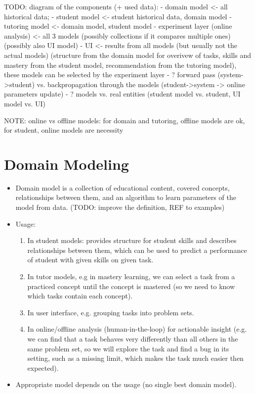 TODO: diagram of the components (+ used data):
- domain model <- all historical data;
- student model <- student historical data, domain model
- tutoring model <- domain model, student model
- experiment layer (online analysis) <- all 3 models (possibly collections if it compares multiple ones) (possibly also UI model)
- UI <- results from all models (but usually not the actual models) (structure from the domain model for overivew of tasks, skills and mastery from the student model, recommendation from the tutoring model), these models can be selected by the experiment layer
- ? forward pass (system->student) vs. backpropagation through the models (student->system -> online parameters update)
- ? models vs. real entities (student model vs. student, UI model vs. UI)


NOTE: online vs offline models: for domain and tutoring, offline models are ok, for student, online models are necessity




\section{Domain Modeling}
\label{sec:domain-modeling}

\begin{itemize}
\item Domain model is a collection of educational content, covered concepts,
  relationships between them, and an algorithm to learn
  parameters of the model from data.
  (TODO: improve the definition, REF to examples)
\item Usage:
\begin{enumerate}
\item In student models: provides structure for student skills and describes relationships between them, which can be used to predict a performance of student with given skills on given task.
\item In tutor models, e.g in mastery learning, we can select a task from a practiced concept until the concept is mastered (so we need to know which tasks contain each concept).
\item In user interface, e.g. grouping tasks into problem sets.
\item In online/offline analysis (human-in-the-loop) for actionable insight
    (e.g. we can find that a task behaves very differently than all others in
    the same problem set, so we will explore the task and find a bug in its setting,
    such as a missing limit, which makes the task much easier then expected).
\end{enumerate}
\item Appropriate model depends on the usage (no single best domain model).
\end{itemize}


